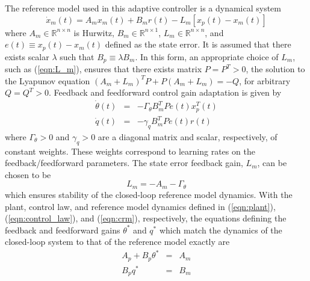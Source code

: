 The reference model used in this adaptive controller is a dynamical system 
\begin{equation}
	\dot{x}_m(t) = A_m x_m(t) + B_m r(t) - L_m \left[x_p(t) - x_m(t)\right]
	\label{eqn:crm}
\end{equation} %
\noindent where $A_m \in \mathbb{R}^{n \times n}$ is Hurwitz, $B_m \in \mathbb{R}^{n \times 1}$, $L_m \in \mathbb{R}^{n \times n}$, and $e(t) \equiv x_p(t) - x_m(t)$ defined as the state error. It is assumed that there exists scalar $\lambda$ such that $B_p \equiv \lambda B_m$. In this form, an appropriate choice of $L_m$, such as (\ref{eqn:L_m}), ensures that there exists matrix $P = P^T > 0$, the solution to the Lyapunov equation $(A_m + L_m)^T P + P(A_m + L_m) = - Q$, for arbitrary $Q = Q^T > 0$. Feedback and feedforward control gain adaptation is given by
\begin{eqnarray}
	\dot{\theta}(t) &=& - \Gamma_\theta B_m^T P e(t) x_p^T(t) \label{eqn:adaptive_law_theta}\\
	\dot{q}(t) &=& - \gamma_q B_m^T P e(t) r(t)
	\label{eqn:adaptive_law_gamma}
\end{eqnarray}
\noindent where $\Gamma_\theta > 0$ and $\gamma_q > 0$ are a diagonal matrix and scalar, respectively, of constant weights. These weights correspond to learning rates on the feedback/feedforward parameters. The state error feedback gain, $L_m$, can be chosen to be
\begin{equation}
	L_m = - A_m - \Gamma_\theta
	\label{eqn:L_m}
\end{equation}
\noindent which ensures stability of the closed-loop reference model dynamics. With the plant, control law, and reference model dynamics defined in (\ref{eqn:plant}), (\ref{eqn:control_law}), and (\ref{eqn:crm}), respectively, the equations defining the feedback and feedforward gains $\theta^*$ and $q^*$ which match the dynamics of the closed-loop system to that of the reference model exactly are 
\begin{eqnarray}
	A_p + B_p \theta^* &=& A_m \label{eqn:matchcond1} \\
	B_p q^* &=& B_m \label{eqn:matchcond2} 
\end{eqnarray}

